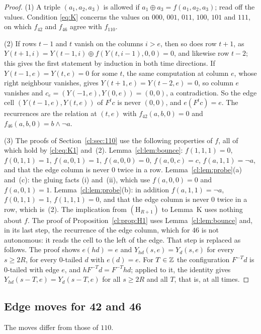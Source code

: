 \begin{proof}
(1) A triple $(a_1,a_2,a_3)$ is allowed if $a_1\oplus a_3=f(a_1,a_2,a_3)$; read off the values. Condition \eqref{eq:K} concerns the values on $000$, $001$, $011$, $100$, $101$ and $111$, on which $f_{42}$ and $f_{46}$ agree with $f_{110}$.

(2) If rows $t-1$ and $t$ vanish on the columns $i>e$, then so does row $t+1$, as $Y(t+1,i)=Y(t-1,i)\oplus f(Y(t,i-1),0,0)=0$, and likewise row $t-2$; this gives the first statement by induction in both time directions. If $Y(t-1,e)=Y(t,e)=0$ for some $t$, the same computation at column $e$, whose right neighbour vanishes, gives $Y(t+1,e)=Y(t-2,e)=0$, so column $e$ vanishes and $c_e=(Y(-1,e),Y(0,e))=(0,0)$, a contradiction. So the edge cell $(Y(t-1,e),Y(t,e))$ of $F^tc$ is never $(0,0)$, and $e(F^tc)=e$. The recurrences are the relation at $(t,e)$ with $f_{42}(a,b,0)=0$ and $f_{46}(a,b,0)=b\wedge\neg a$.

(3) The proofs of Section~\ref{cl:sec:110} use the following properties of $f$, all of which hold by \eqref{cl:eq:K1} and~(2). Lemma~\ref{cl:lem:bounce}: $f(1,1,1)=0$, $f(0,1,1)=1$, $f(a,0,1)=1$, $f(a,0,0)=0$, $f(a,0,c)=c$, $f(a,1,1)=\neg a$, and that the edge column is never $0$ twice in a row. Lemma~\ref{cl:lem:probe}(a) and~(c): the gluing facts (i) and~(ii), which use $f(a,0,0)=0$ and $f(a,0,1)=1$. Lemma~\ref{cl:lem:probe}(b): in addition $f(a,1,1)=\neg a$, $f(0,1,1)=1$, $f(1,1,1)=0$, and that the edge column is never $0$ twice in a row, which is~(2). The implication from $(\mathrm H_{R+1})$ to Lemma~K uses nothing about $f$. The proof of Proposition~\ref{cl:prop:H1} uses Lemma~\ref{cl:lem:bounce} and, in its last step, the recurrence of the edge column, which for $46$ is not autonomous: it reads the cell to the left of the edge. That step is replaced as follows. The proof shows $e(hd)=e$ and $Y_{hd}(s,e)=Y_d(s,e)$ for every $s\ge2R$, for every $0$-tailed $d$ with $e(d)=e$. For $T\in\mathbb{Z}$ the configuration $F^{-T}d$ is $0$-tailed with edge $e$, and $hF^{-T}d=F^{-T}hd$; applied to it, the identity gives $Y_{hd}(s-T,e)=Y_d(s-T,e)$ for all $s\ge2R$ and all $T$, that is, at all times.
\end{proof}

\subsection{Edge moves for 42 and 46}\label{cl:sec:moves1446}

The moves differ from those of $110$.

